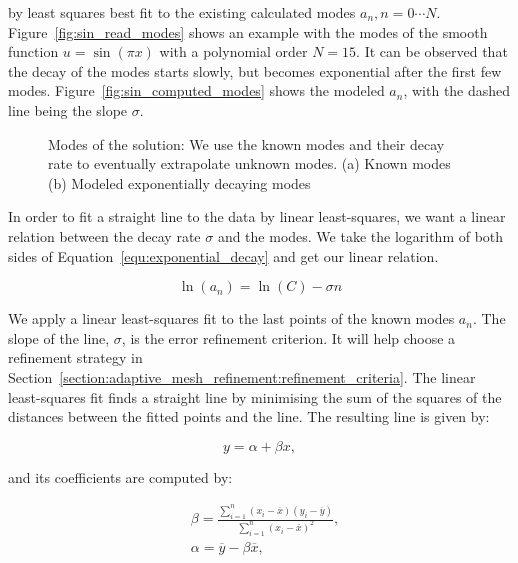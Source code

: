 \noindent
by least squares best fit to the existing calculated modes \(a_n, n = 0 \cdots N\).
Figure~\ref{fig:sin_read_modes} shows an example with the modes of the smooth function \(u =
\sin(\pi x)\) with a polynomial order \(N = 15\). It can be observed that the decay of the modes
starts slowly, but becomes exponential after the first few modes.
Figure~\ref{fig:sin_computed_modes} shows the modeled \(a_n\), with the dashed line being the slope
\( \sigma \).

\begin{figure}[H]
    \centering
    \hfill
    \caption{Modes of the solution: We use the known modes and their decay rate to eventually
    extrapolate unknown modes. (a) Known modes (b) Modeled exponentially decaying modes}\label{fig:sin_modes}
\end{figure}

In order to fit a straight line to the data by linear least-squares, we want a linear relation
between the decay rate \(\sigma \) and the modes. We take the logarithm of both sides of
Equation~\ref{equ:exponential_decay} and get our linear relation.

\begin{equation} \label{equ:exponential_decay_linear}
    \ln(a_n) = \ln(C) - \sigma n
\end{equation}

\noindent
We apply a linear least-squares fit to the last points of the known modes \(a_n\). The slope of the
line, \(\sigma \), is the error refinement criterion. It will help choose a refinement strategy in
Section~\ref{section:adaptive_mesh_refinement:refinement_criteria}. The linear least-squares fit
finds a straight line by minimising the sum of the squares of the distances between the fitted
points and the line. The resulting line is given by:

\begin{equation}
    y = \alpha + \beta x,
\end{equation}

\noindent
and its coefficients are computed by:

\begin{align}
    & \beta = \frac{\sum_{i = 1}^{n}(x_i - \overline{x})(y_i - \overline{y})}{\sum_{i = 1}^{n}{(x_i -\overline{x})}^2}, \\
    & \alpha = \overline{y} - \beta \overline{x},
\end{align}

